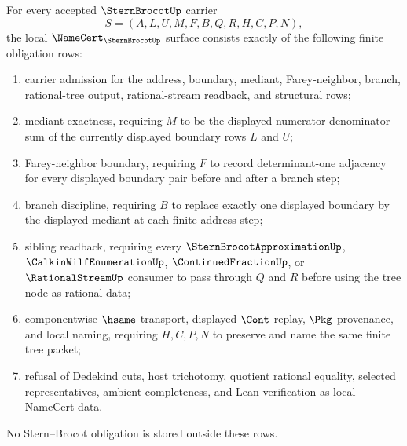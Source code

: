 \begin{theorem}
\label{thm:stern-brocot-namecert-obligations}
For every accepted $\SternBrocotUp$ carrier
$$
S=(A,L,U,M,F,B,Q,R,H,C,P,N),
$$
the local $\NameCert_{\SternBrocotUp}$ surface consists exactly of the following finite obligation rows:
\begin{enumerate}
\item carrier admission for the address, boundary, mediant, Farey-neighbor, branch, rational-tree output, rational-stream readback, and structural rows;
\item mediant exactness, requiring $M$ to be the displayed numerator-denominator sum of the currently displayed boundary rows $L$ and $U$;
\item Farey-neighbor boundary, requiring $F$ to record determinant-one adjacency for every displayed boundary pair before and after a branch step;
\item branch discipline, requiring $B$ to replace exactly one displayed boundary by the displayed mediant at each finite address step;
\item sibling readback, requiring every $\SternBrocotApproximationUp$, $\CalkinWilfEnumerationUp$, $\ContinuedFractionUp$, or $\RationalStreamUp$ consumer to pass through $Q$ and $R$ before using the tree node as rational data;
\item componentwise $\hsame$ transport, displayed $\Cont$ replay, $\Pkg$ provenance, and local naming, requiring $H,C,P,N$ to preserve and name the same finite tree packet;
\item refusal of Dedekind cuts, host trichotomy, quotient rational equality, selected representatives, ambient completeness, and Lean verification as local NameCert data.
\end{enumerate}
No Stern--Brocot obligation is stored outside these rows.
\end{theorem}
